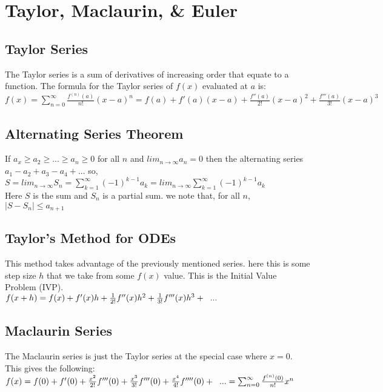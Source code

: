 \section{Taylor, Maclaurin, \& Euler}

\subsection*{Taylor Series}
The Taylor series is a sum of derivatives of increasing order that equate to a function. The formula for
the Taylor series of $f(x)$ evaluated at $a$ is:\\
$f(x) = \sum_{n=0}^{\infty} \frac{f^{(n)}(a)}{n!}(x - a)^n  = f(a) + f'(a)(x-a) + \frac{f''(a)}{2!} (x - a)^2 + \frac{f'''(a)}{3!} (x-a)^3 $\\

\subsection*{Alternating Series Theorem}
If $a_x \geq a_2 \geq ... \geq a_n \geq 0$ for all $n$ and $lim_{n \rightarrow \infty} a_n = 0$
then the alternating series $a_1 - a_2 + a_3 - a_4 + ...$ so,\\
$S = lim_{n \rightarrow \infty} S_n = \sum_{k=1}^{\infty} (-1)^{k-1} a_k = lim_{n \rightarrow \infty} \sum_{k=1}^{\infty} (-1)^{k-1} a_k$\\
Here $S$ is the sum and $S_n$ is a partial sum. we note that, for all $n$, $|S - S_n| \leq a_{n+1}$

\subsection*{Taylor's Method for ODEs}
This method takes advantage of the previously mentioned series. here this is some
step size $h$ that we take from some $f(x)$ value. This is the Initial Value Problem (IVP).\\
$f(x + h) = f(x) + f'(x)h + \frac{1}{2!}f''(x)h^2 + \frac{1}{3!}f'''(x)h^3 + \hspace{2mm} ...$\\

\subsection*{Maclaurin Series}
The Maclaurin series is just the Taylor series at the special case where $x=0$.
This gives the following:\\
$f(x) = f(0) + f'(0) + \frac{x^2}{2!}f'''(0) + \frac{x^3}{3!}f'''(0) + \frac{x^4}{4!}f''''(0) + \hspace{2mm} ... = \sum_{n=0}^{\infty} \frac{f^{(n)}(0)}{n!}x^n$\\

